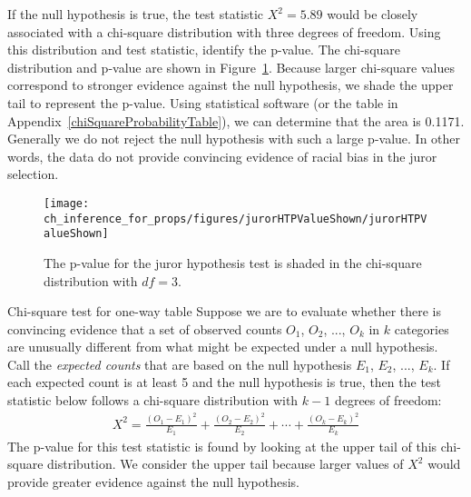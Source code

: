 \begin{examplewrap}
\begin{nexample}{If the null hypothesis is true,
    the test statistic $X^2=5.89$ would be closely
    associated with a chi-square distribution with
    three degrees of freedom.
    Using this distribution and test statistic,
    identify the p-value.}
  The chi-square distribution and p-value are shown in
  Figure~\ref{jurorHTPValueShown}.
  Because larger chi-square values correspond to stronger
  evidence against the null hypothesis, we shade the upper
  tail to represent the p-value.
  Using statistical software (or the table in
  Appendix~\ref{chiSquareProbabilityTable}),
  we can determine that the area is 0.1171.
  Generally we do not reject the null hypothesis
  with such a large p-value.
  In other words, the data do not provide convincing evidence
  of racial bias in the juror selection.
\end{nexample}
\end{examplewrap}

\begin{figure}[h]
\centering
\texttt{[image: ch\_inference\_for\_props/figures/jurorHTPValueShown/jurorHTPValueShown]}
\caption{The p-value for the juror hypothesis test is shaded in the chi-square distribution with $df=3$.}
\label{jurorHTPValueShown}
\end{figure}


\begin{onebox}{Chi-square test for one-way table}
  Suppose we are to evaluate whether there is convincing
  evidence that a set of observed counts $O_1$, $O_2$, ...,
  $O_k$ in $k$ categories are unusually different from what
  might be expected under a null hypothesis.
  Call the \emph{expected counts} that are based on the null
  hypothesis $E_1$, $E_2$, ..., $E_k$.
  If each expected count is at least 5 and the null hypothesis
  is true, then the test statistic below follows a chi-square
  distribution with $k-1$ degrees of freedom:
  \begin{align*}
  X^2
    = \frac{(O_1 - E_1)^2}{E_1} +
        \frac{(O_2 - E_2)^2}{E_2} +
        \cdots +
        \frac{(O_k - E_k)^2}{E_k}
  \end{align*}
  The p-value for this test statistic is found by looking
  at the upper tail of this chi-square distribution.
  We consider the upper tail because larger values of $X^2$
  would provide greater evidence against the null hypothesis.
\end{onebox}

